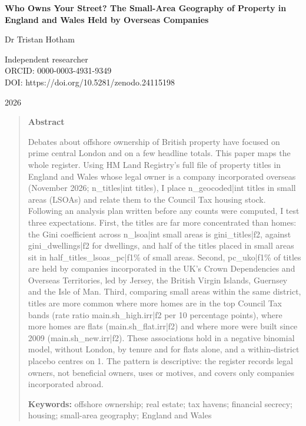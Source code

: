 \documentclass[11pt,a4paper]{article}
\begin{document}
\begin{center}
{\Large\bfseries Who Owns Your Street? The Small-Area Geography of Property in England and Wales Held by Overseas Companies\par}
\vspace{1.2em}
{\large Dr Tristan Hotham\par}
\vspace{0.3em}
{\small Independent researcher\\
ORCID: 0000-0003-4931-9349\\
DOI: https://doi.org/10.5281/zenodo.24115198\par}
\vspace{0.8em}
2026
\end{center}

\begin{quote}
\small
\begin{center}\textbf{Abstract}\end{center}
Debates about offshore ownership of British property have focused on prime central London and on a few headline totals. This paper maps the whole register. Using HM Land Registry's full file of property titles in England and Wales whose legal owner is a company incorporated overseas (November 2026; {{n_titles|int}} titles), I place {{n_geocoded|int}} titles in small areas (LSOAs) and relate them to the Council Tax housing stock. Following an analysis plan written before any counts were computed, I test three expectations. First, the titles are far more concentrated than homes: the Gini coefficient across {{n_lsoa|int}} small areas is {{gini_titles|f2}}, against {{gini_dwellings|f2}} for dwellings, and half of the titles placed in small areas sit in {{half_titles_lsoas_pc|f1}}\% of small areas. Second, {{pc_uko|f1}}\% of titles are held by companies incorporated in the UK's Crown Dependencies and Overseas Territories, led by Jersey, the British Virgin Islands, Guernsey and the Isle of Man. Third, comparing small areas within the same district, titles are more common where more homes are in the top Council Tax bands (rate ratio {{main.sh_high.irr|f2}} per 10 percentage points), where more homes are flats ({{main.sh_flat.irr|f2}}) and where more were built since 2009 ({{main.sh_new.irr|f2}}). These associations hold in a negative binomial model, without London, by tenure and for flats alone, and a within-district placebo centres on 1. The pattern is descriptive: the register records legal owners, not beneficial owners, uses or motives, and covers only companies incorporated abroad.

\textbf{Keywords:} offshore ownership; real estate; tax havens; financial secrecy; housing; small-area geography; England and Wales
\end{quote}
\end{document}
